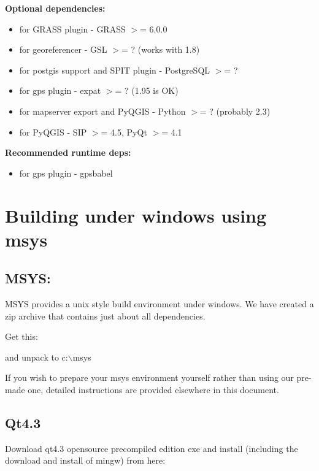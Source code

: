 \textbf{Optional dependencies:}

\begin {itemize}
\item for GRASS plugin - GRASS $>$= 6.0.0
\item for georeferencer - GSL $>$= ? (works with 1.8)
\item for postgis support and SPIT plugin - PostgreSQL $>$= ?
\item for gps plugin - expat $>$= ? (1.95 is OK)
\item for mapserver export and PyQGIS - Python $>$= ? (probably 2.3)
\item for PyQGIS - SIP $>$= 4.5, PyQt $>$= 4.1
\end{itemize}

\textbf{Recommended runtime deps:}

\begin {itemize}
\item for gps plugin - gpsbabel
\end{itemize}

\section{Building under windows using msys}\label{sec:install_windows}
\subsection{MSYS:}
MSYS provides a unix style build environment under windows. We have created a
zip archive that contains just about all dependencies.

Get this: 


and unpack to c:$\backslash$msys

If you wish to prepare your msys environment yourself rather than using 
our pre-made one, detailed instructions are provided elsewhere in this
document.

\subsection{Qt4.3}
Download qt4.3 opensource precompiled edition exe and install (including the
download and install of mingw) from here:


